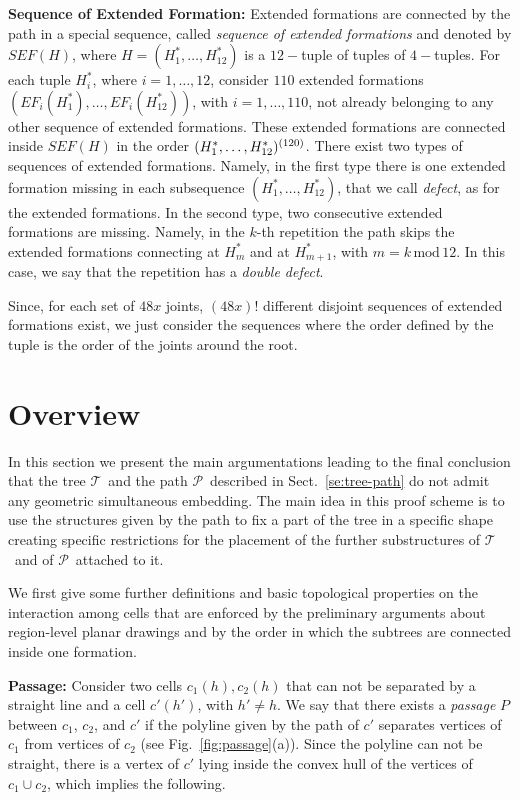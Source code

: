 \documentclass[a4paper,10pt]{llncs}
\newcounter{prop}
\newcommand{\T}{\mbox{$\mathcal T$ }}
\renewcommand{\P}{\mbox{$\mathcal P$ }}
\begin{document}
{\bf Sequence of Extended Formation:}
Extended formations are connected by the path in a special sequence, called {\it sequence of extended formations} and denoted by $SEF(H)$, where $H=(H_1^*, \dots, H_{12}^*)$ is a $12-$tuple of tuples of $4-$tuples. For each tuple $H_i^*$, where $i=1,\ldots, 12$, consider $110$ extended formations $(EF_i(H_1^*), \dots, EF_i(H_{12}^*))$, with $i=1,\dots,110$, not already belonging to any other sequence of extended formations.
These extended formations are connected inside $SEF(H)$ in the order $(H_1^*,\dots,\\H_{12}^*)^{(120)}$. There exist two types of sequences of extended formations. Namely, in the first type there is one extended formation missing in each subsequence $(H_1^*,\dots,H_{12}^*)$, that we call \emph{defect}, as for the extended formations. In the second type, two consecutive extended formations are missing. Namely, in the $k$-th repetition the path skips the extended formations connecting at $H_m^*$ and at $H_{m+1}^*$, with $m = k \,\mathrm{mod}\, 12$. In this case, we say that the repetition has a \emph{double defect}.

Since, for each set of $48x$ joints, $(48x)!$ different disjoint sequences of extended formations exist, we just consider the sequences where the order defined by the tuple is the order of the joints around the root.

\section{Overview}\label{se:overview}

In this section we present the main argumentations leading to the final conclusion that the tree \T and the path \P described in Sect.~\ref{se:tree-path} do not admit any geometric simultaneous embedding. The main idea in this proof scheme is to use the structures given by the path to fix a part of the tree in a specific shape creating specific restrictions for the placement of the further substructures of \T and of \P attached to it.

We first give some further definitions and basic topological properties on the interaction among cells that are enforced by the preliminary arguments about region-level planar drawings and by the order in which the subtrees are connected inside one formation.

{\bf Passage:} Consider two cells $c_1(h),c_2(h)$ that can not be separated by a straight line and a cell $c'(h')$, with $h' \not= h$. We say that there exists a {\it passage} $P$ between $c_1$, $c_2$, and $c'$ if the polyline given by the path of $c'$ separates vertices of $c_1$ from vertices of $c_2$ (see Fig.~\ref{fig:passage}(a)). Since the polyline can not be straight, there is a vertex of $c'$ lying inside the convex hull of the vertices of $c_1\cup c_2$, which implies the following.
\end{document}
